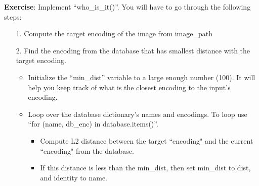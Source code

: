{\textbf{Exercise}}: Implement ``who\_is\_it()''. You will have to go through the following steps:
\begin{itemize}
\item[1.] Compute the target encoding of the image from image\_path
\item[2.] Find the encoding from the database that has smallest distance with the target encoding. 
    \begin{itemize}
    \item Initialize the ``min\_dist'' variable to a large enough number (100). It will help you keep track of what is the closest encoding to the input's encoding.
    \item Loop over the database dictionary's names and encodings. To loop use ``for (name, db\_enc) in database.items()''.
        \begin{itemize}
        \item Compute L2 distance between the target ``encoding" and the current ``encoding" from the database.
        \item If this distance is less than the min\_dist, then set min\_dist to dist, and identity to name.
        \end{itemize}
    \end{itemize}  
\end{itemize}        
        
